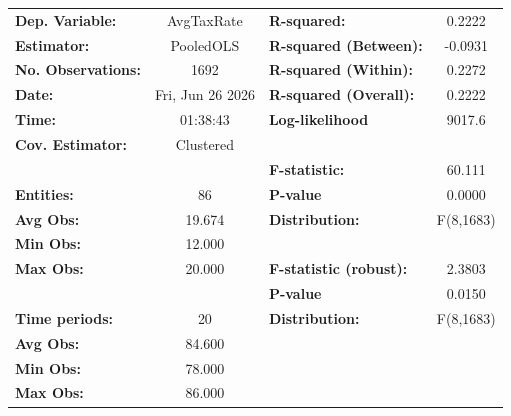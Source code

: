 \begin{center}
\begin{tabular}{lclc}
\toprule
\textbf{Dep. Variable:}                       &     AvgTaxRate     & \textbf{  R-squared:         }   &      0.2222      \\
\textbf{Estimator:}                           &     PooledOLS      & \textbf{  R-squared (Between):}  &     -0.0931      \\
\textbf{No. Observations:}                    &        1692        & \textbf{  R-squared (Within):}   &      0.2272      \\
\textbf{Date:}                                &  Fri, Jun 26 2026  & \textbf{  R-squared (Overall):}  &      0.2222      \\
\textbf{Time:}                                &      01:38:43      & \textbf{  Log-likelihood     }   &      9017.6      \\
\textbf{Cov. Estimator:}                      &     Clustered      & \textbf{                     }   &                  \\
\textbf{}                                     &                    & \textbf{  F-statistic:       }   &      60.111      \\
\textbf{Entities:}                            &         86         & \textbf{  P-value            }   &      0.0000      \\
\textbf{Avg Obs:}                             &       19.674       & \textbf{  Distribution:      }   &    F(8,1683)     \\
\textbf{Min Obs:}                             &       12.000       & \textbf{                     }   &                  \\
\textbf{Max Obs:}                             &       20.000       & \textbf{  F-statistic (robust):} &      2.3803      \\
\textbf{}                                     &                    & \textbf{  P-value            }   &      0.0150      \\
\textbf{Time periods:}                        &         20         & \textbf{  Distribution:      }   &    F(8,1683)     \\
\textbf{Avg Obs:}                             &       84.600       & \textbf{                     }   &                  \\
\textbf{Min Obs:}                             &       78.000       & \textbf{                     }   &                  \\
\textbf{Max Obs:}                             &       86.000       & \textbf{                     }   &                  \\

\end{tabular}
\end{center}
